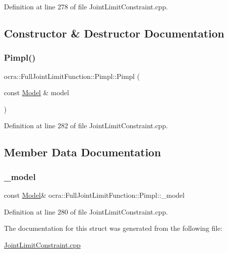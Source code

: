 Definition at line 278 of file Joint\+Limit\+Constraint.\+cpp.



\subsection{Constructor \& Destructor Documentation}
\hypertarget{structFullJointLimitFunction_1_1Pimpl_aa3d5e5c11c4204da38bb6086315e22d8}{}\label{structFullJointLimitFunction_1_1Pimpl_aa3d5e5c11c4204da38bb6086315e22d8} 
\subsubsection{\texorpdfstring{Pimpl()}{Pimpl()}}
{\footnotesize\ttfamily ocra\+::\+Full\+Joint\+Limit\+Function\+::\+Pimpl\+::\+Pimpl (\begin{DoxyParamCaption}\item[{const \hyperlink{classocra_1_1Model}{Model} \&}]{model }\end{DoxyParamCaption})\hspace{0.3cm}{\ttfamily [inline]}}



Definition at line 282 of file Joint\+Limit\+Constraint.\+cpp.



\subsection{Member Data Documentation}
\hypertarget{structFullJointLimitFunction_1_1Pimpl_a1405a83bd59c5c592bec3e5ec1f394ca}{}\label{structFullJointLimitFunction_1_1Pimpl_a1405a83bd59c5c592bec3e5ec1f394ca} 
\subsubsection{\texorpdfstring{\+\_\+model}{\_model}}
{\footnotesize\ttfamily const \hyperlink{classocra_1_1Model}{Model}\& ocra\+::\+Full\+Joint\+Limit\+Function\+::\+Pimpl\+::\+\_\+model}



Definition at line 280 of file Joint\+Limit\+Constraint.\+cpp.



The documentation for this struct was generated from the following file\+:\begin{DoxyCompactItemize}
\item 
\hyperlink{JointLimitConstraint_8cpp}{Joint\+Limit\+Constraint.\+cpp}\end{DoxyCompactItemize}

